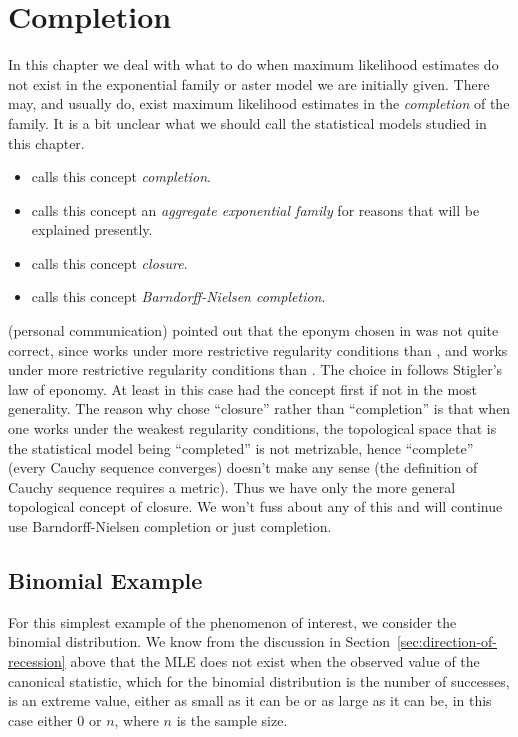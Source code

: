 
\chapter{Completion} \label{ch:completion}

In this chapter we deal with what to do when maximum likelihood estimates
do not exist in the exponential family or aster model we are initially given.
There may, and usually do, exist maximum likelihood estimates in the
\emph{completion} of the family.  It is a bit unclear what we should call
the statistical models studied in this chapter.
\begin{itemize}
\item \citet[Sections~9.3 and~9.4]{barndorff-nielsen} calls this concept
    \emph{completion}.
\item \citet[Chapter~6]{brown} calls this concept
    an \emph{aggregate exponential family} for reasons that will be explained
    presently.
\item \citet[Chapters~2 and~4]{geyer-thesis} calls this concept
    \emph{closure}.
\item \citet{geyer-gdor} calls this concept
    \emph{Barndorff-Nielsen completion}.
\end{itemize}
\citeauthor{brown} (personal communication) pointed out that the eponym chosen
in \citet{geyer-gdor} was not quite correct, since \citet{barndorff-nielsen}
works under more restrictive regularity conditions than \citet{brown}, and
\citet{brown} works under more restrictive regularity conditions than
\citet{geyer-thesis}.  The choice in \citet{geyer-gdor} follows
Stigler's law of eponomy.  At least in this case \citeauthor{barndorff-nielsen}
had the concept first if not in the most generality.
The reason why \citet{geyer-thesis} chose ``closure'' rather than ``completion''
is that when one works under the weakest regularity conditions, the topological
space that is the statistical model being ``completed'' is not metrizable,
hence ``complete'' (every Cauchy sequence converges) doesn't make any sense
(the definition of Cauchy sequence requires a metric).  Thus we have only
the more general topological concept of closure.
We won't fuss about any of this and will continue use Barndorff-Nielsen
completion or just completion.

\section{Binomial Example}

For this simplest example of the phenomenon of interest, we consider the
binomial distribution.  We know from the discussion
in Section~\ref{sec:direction-of-recession} above that the MLE does not exist
when the observed value of the canonical statistic, which for the binomial
distribution is the number of successes, is an extreme value, either as small
as it can be or as large as it can be, in this case either 0 or $n$, where
$n$ is the sample size.

